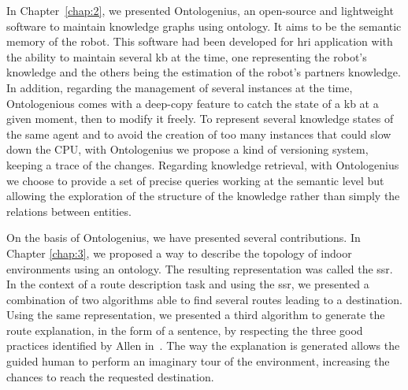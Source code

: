In Chapter~\ref{chap:2}, we presented Ontologenius, an open-source and lightweight software to maintain knowledge graphs using ontology. It aims to be the semantic memory of the robot. This software had been developed for \acrshort{hri} application with the ability to maintain several \acrlong{kb} at the time, one representing the robot's knowledge and the others being the estimation of the robot's partners knowledge. In addition, regarding the management of several instances at the time, Ontologenious comes with a deep-copy feature to catch the state of a \acrshort{kb} at a given moment, then to modify it freely. To represent several knowledge states of the same agent and to avoid the creation of too many instances that could slow down the CPU, with Ontologenius we propose a kind of versioning system, keeping a trace of the changes. Regarding knowledge retrieval, with Ontologenius we choose to provide a set of precise queries working at the semantic level but allowing the exploration of the structure of the knowledge rather than simply the relations between entities.

On the basis of Ontologenius, we have presented several contributions. In Chapter \ref{chap:3}, we proposed a way to describe the topology of indoor environments using an ontology. The resulting representation was called the \acrfull{ssr}. In the context of a route description task and using the \acrshort{ssr}, we presented a combination of two algorithms able to find several routes leading to a destination. Using the same representation, we presented a third algorithm to generate the route explanation, in the form of a sentence, by respecting the three good practices identified by Allen in~\cite{allen_2000_principles}. The way the explanation is generated allows the guided human to perform an imaginary tour of the environment, increasing the chances to reach the requested destination.

